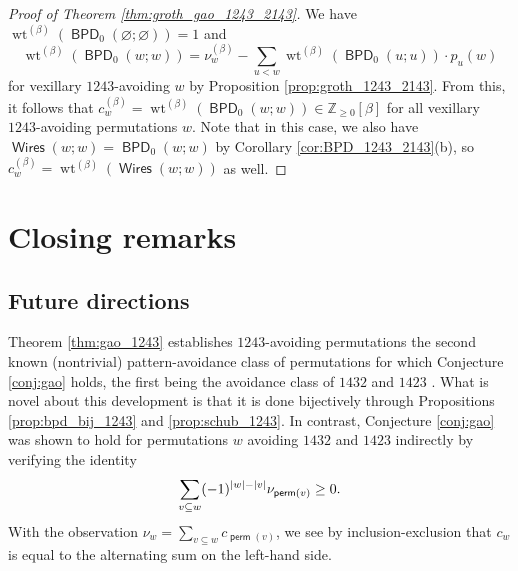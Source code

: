 \documentclass[11pt]{article}
\theoremstyle{definition}
\numberwithin{equation}{section}
\newcommand{\Z}{\mathbb{Z}}
\newcommand{\sseq}{\subseteq}
\DeclarePairedDelimiter\abs{\lvert}{\rvert}
\DeclareMathOperator{\wt}{wt}
\DeclareMathOperator{\perm}{\mathsf{perm}}
\DeclareMathOperator{\Wires}{\mathsf{Wires}}
\DeclareMathOperator{\BPD}{\mathsf{BPD}}
\begin{document}
\begin{proof}[Proof of Theorem \ref{thm:groth_gao_1243_2143}]
We have $\wt^{(\beta)}(\BPD_0(\varnothing;\varnothing)) = 1$ and \[
    \wt^{(\beta)}(\BPD_0(w;w))
    = \nu^{(\beta)}_w - \sum_{u< w} \wt^{(\beta)}(\BPD_0(u;u))\cdot p_u(w)
\] for vexillary $1243$-avoiding $w$ by Proposition \ref{prop:groth_1243_2143}.
From this, it follows that $c^{(\beta)}_w = \wt^{(\beta)}(\BPD_0(w;w)) \in \Z_{\geq0}[\beta]$ for all vexillary $1243$-avoiding permutations $w$.
Note that in this case, we also have $\Wires(w;w) = \BPD_0(w;w)$ by Corollary \ref{cor:BPD_1243_2143}(b), so $c^{(\beta)}_w = \wt^{(\beta)}(\Wires(w;w))$ as well.
\end{proof}





\section{Closing remarks}

\subsection{Future directions}

Theorem \ref{thm:gao_1243} establishes $1243$-avoiding permutations the second known (nontrivial) pattern-avoidance class of permutations for which Conjecture \ref{conj:gao} holds, the first being the avoidance class of $1432$ and $1423$ \cite{MT22}.
What is novel about this development is that it is done bijectively through Propositions \ref{prop:bpd_bij_1243} and \ref{prop:schub_1243}.
In contrast, Conjecture \ref{conj:gao} was shown to hold for permutations $w$ avoiding $1432$ and $1423$ \cite{MT22} indirectly by verifying the identity \[
    \sum_{v\sseq w} (-1)^{\abs*{w}-\abs*{v}}\nu_{\perm(v)} \geq 0.
\]
With the observation $\nu_w = \sum_{v\sseq w} c_{\perm(v)}$, we see by inclusion-exclusion that $c_w$ is equal to the alternating sum on the left-hand side.
\end{document}

